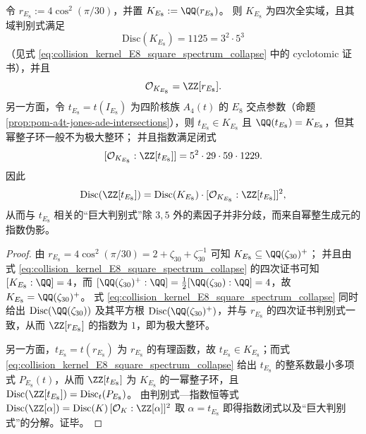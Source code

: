 \begin{proposition}\label{prop:pom-e8-intersection-field-discriminant-index}
令 \(r_{E_8}:=4\cos^2(\pi/30)\)，并置 \(K_{E_8}:=\QQ(r_{E_8})\)。
则 \(K_{E_8}\) 为四次全实域，且其域判别式满足
\[
\mathrm{Disc}(K_{E_8})=1125=3^2\cdot 5^3
\]
（见式 \eqref{eq:collision_kernel_E8_square_spectrum_collapse} 中的 cyclotomic 证书），并且
\[
\mathcal O_{K_{E_8}}=\ZZ[r_{E_8}].
\]
另一方面，令 \(t_{E_8}=t(I_{E_8})\) 为四阶核族 \(A_4(t)\) 的 \(E_8\) 交点参数（命题 \ref{prop:pom-a4t-jones-ade-intersections}），则 \(t_{E_8}\in K_{E_8}\) 且 \(\QQ(t_{E_8})=K_{E_8}\)，但其幂整子环一般不为极大整环；
并且指数满足闭式
\[
[\mathcal O_{K_{E_8}}:\ZZ[t_{E_8}]]=5^2\cdot 29\cdot 59\cdot 1229.
\]
因此
\[
\mathrm{Disc}(\ZZ[t_{E_8}])=\mathrm{Disc}(K_{E_8})\cdot[\mathcal O_{K_{E_8}}:\ZZ[t_{E_8}]]^{2},
\]
从而与 \(t_{E_8}\) 相关的“巨大判别式”除 \(3,5\) 外的素因子并非分歧，而来自幂整生成元的指数伪影。
\end{proposition}
\begin{proof}
由 \(r_{E_8}=4\cos^2(\pi/30)=2+\zeta_{30}+\zeta_{30}^{-1}\) 可知 \(K_{E_8}\subseteq \QQ(\zeta_{30})^+\)；
并且由式 \eqref{eq:collision_kernel_E8_square_spectrum_collapse} 的四次证书可知 \([K_{E_8}:\QQ]=4\)，而 \([\QQ(\zeta_{30})^+:\QQ]=\tfrac12[\QQ(\zeta_{30}):\QQ]=4\)，故 \(K_{E_8}=\QQ(\zeta_{30})^+\)。
式 \eqref{eq:collision_kernel_E8_square_spectrum_collapse} 同时给出 \(\mathrm{Disc}(\QQ(\zeta_{30}))\) 及其平方根 \(\mathrm{Disc}(\QQ(\zeta_{30})^+)\)，并与 \(r_{E_8}\) 的四次证书判别式一致，从而 \(\ZZ[r_{E_8}]\) 的指数为 \(1\)，即为极大整环。
\par
另一方面，\(t_{E_8}=t(r_{E_8})\) 为 \(r_{E_8}\) 的有理函数，故 \(t_{E_8}\in K_{E_8}\)；而式 \eqref{eq:collision_kernel_E8_square_spectrum_collapse} 给出 \(t_{E_8}\) 的整系数最小多项式 \(P_{E_8}(t)\)，从而 \(\ZZ[t_{E_8}]\) 为 \(K_{E_8}\) 的一幂整子环，且
\(\mathrm{Disc}(\ZZ[t_{E_8}])=\mathrm{Disc}_t(P_{E_8})\)。
由判别式—指数恒等式
\(
\mathrm{Disc}(\ZZ[\alpha])=\mathrm{Disc}(K)\,[\mathcal O_K:\ZZ[\alpha]]^2
\)
取 \(\alpha=t_{E_8}\) 即得指数闭式以及“巨大判别式”的分解。证毕。
\end{proof}

